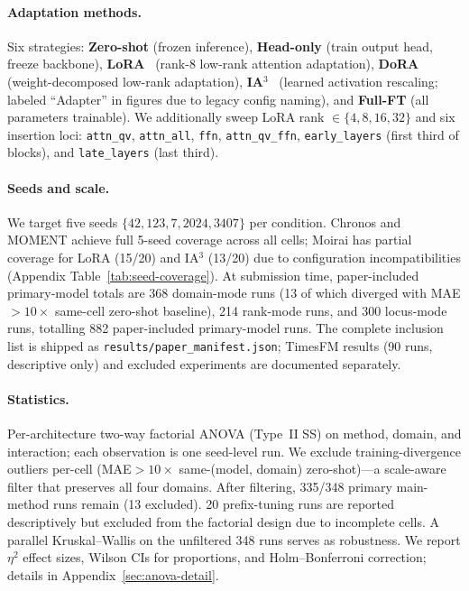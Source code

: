 \documentclass{article}
\begin{document}
\paragraph{Adaptation methods.}
Six strategies: \textbf{Zero-shot} (frozen inference), \textbf{Head-only} (train output head, freeze backbone), \textbf{LoRA}~\citep{hu2022lora} (rank-8 low-rank attention adaptation), \textbf{DoRA}~\citep{dora2024} (weight-decomposed low-rank adaptation), \textbf{IA$^3$}~\citep{liu2022ia3} (learned activation rescaling; labeled ``Adapter'' in figures due to legacy config naming), and \textbf{Full-FT} (all parameters trainable). We additionally sweep LoRA rank $\in\{4,8,16,32\}$ and six insertion loci: \texttt{attn\_qv}, \texttt{attn\_all}, \texttt{ffn}, \texttt{attn\_qv\_ffn}, \texttt{early\_layers} (first third of blocks), and \texttt{late\_layers} (last third).

\paragraph{Seeds and scale.}
We target five seeds $\{42,123,7,2024,3407\}$ per condition. Chronos and MOMENT achieve full 5-seed coverage across all cells; Moirai has partial coverage for LoRA (15/20) and IA$^3$ (13/20) due to configuration incompatibilities (Appendix Table~\ref{tab:seed-coverage}). At submission time, paper-included primary-model totals are 368 domain-mode runs (13 of which diverged with MAE${>}10\times$ same-cell zero-shot baseline), 214 rank-mode runs, and 300 locus-mode runs, totalling 882 paper-included primary-model runs. The complete inclusion list is shipped as \texttt{results/paper\_manifest.json}; TimesFM results (90 runs, descriptive only) and excluded experiments are documented separately.

\paragraph{Statistics.}
Per-architecture two-way factorial ANOVA (Type~II SS) on method, domain, and interaction; each observation is one seed-level run. We exclude training-divergence outliers per-cell (MAE${>}10\times$ same-(model, domain) zero-shot)---a scale-aware filter that preserves all four domains. After filtering, 335/348 primary main-method runs remain (13 excluded). 20 prefix-tuning runs are reported descriptively but excluded from the factorial design due to incomplete cells. A parallel Kruskal--Wallis on the unfiltered 348 runs serves as robustness. We report $\eta^2$ effect sizes, Wilson CIs for proportions, and Holm--Bonferroni correction; details in Appendix~\ref{sec:anova-detail}.
\end{document}
